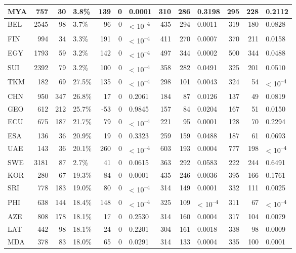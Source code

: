 \begin{tabular}{l|r|r|l|r|r|l|r|r|l|r|r|l}
\hline
MYA & 757 & 30 & 3.8\% & 139 & 0 & 0.0001 & 310 & 286 & 0.3198 & 295 & 228 & 0.2112\\
\hline
BEL & 2545 & 98 & 3.7\% & 96 & 0 & < 10\textsuperscript{--4} & 435 & 294 & 0.0011 & 319 & 180 & 0.0828\\
\hline
FIN & 994 & 34 & 3.3\% & 191 & 0 & < 10\textsuperscript{--4} & 411 & 270 & 0.0007 & 370 & 211 & 0.0158\\
\hline
EGY & 1793 & 59 & 3.2\% & 142 & 0 & < 10\textsuperscript{--4} & 497 & 344 & 0.0002 & 500 & 344 & 0.0488\\
\hline
SUI & 2392 & 79 & 3.2\% & 100 & 0 & < 10\textsuperscript{--4} & 358 & 282 & 0.0491 & 325 & 201 & 0.0510\\
\hline
TKM & 182 & 69 & 27.5\% & 135 & 0 & < 10\textsuperscript{--4} & 298 & 101 & 0.0043 & 324 & 54 & < 10\textsuperscript{--4}\\
\hline
CHN & 950 & 347 & 26.8\% & 17 & 0 & 0.2061 & 184 & 87 & 0.0126 & 137 & 49 & 0.0819\\
\hline
GEO & 612 & 212 & 25.7\% & -53 & 0 & 0.9845 & 157 & 84 & 0.0204 & 167 & 51 & 0.0150\\
\hline
ECU & 675 & 187 & 21.7\% & 79 & 0 & < 10\textsuperscript{--4} & 221 & 95 & 0.0001 & 128 & 70 & 0.2294\\
\hline
ESA & 136 & 36 & 20.9\% & 19 & 0 & 0.3323 & 259 & 159 & 0.0488 & 187 & 61 & 0.0693\\
\hline
UAE & 143 & 36 & 20.1\% & 260 & 0 & < 10\textsuperscript{--4} & 603 & 193 & 0.0004 & 777 & 198 & < 10\textsuperscript{--4}\\
\hline
SWE & 3181 & 87 & 2.7\% & 41 & 0 & 0.0615 & 363 & 292 & 0.0583 & 222 & 244 & 0.6491\\
\hline
KOR & 280 & 67 & 19.3\% & 84 & 0 & 0.0001 & 435 & 246 & 0.0036 & 395 & 166 & 0.1761\\
\hline
SRI & 778 & 183 & 19.0\% & 80 & 0 & < 10\textsuperscript{--4} & 314 & 149 & 0.0001 & 332 & 111 & 0.0025\\
\hline
PHI & 638 & 144 & 18.4\% & 148 & 0 & < 10\textsuperscript{--4} & 325 & 109 & < 10\textsuperscript{--4} & 311 & 67 & < 10\textsuperscript{--4}\\
\hline
AZE & 808 & 178 & 18.1\% & 17 & 0 & 0.2530 & 314 & 160 & 0.0004 & 317 & 104 & 0.0079\\
\hline
LAT & 442 & 98 & 18.1\% & 24 & 0 & 0.2201 & 304 & 161 & 0.0018 & 338 & 98 & 0.0009\\
\hline
MDA & 378 & 83 & 18.0\% & 65 & 0 & 0.0291 & 314 & 133 & 0.0004 & 335 & 100 & 0.0001\\

\end{tabular}
